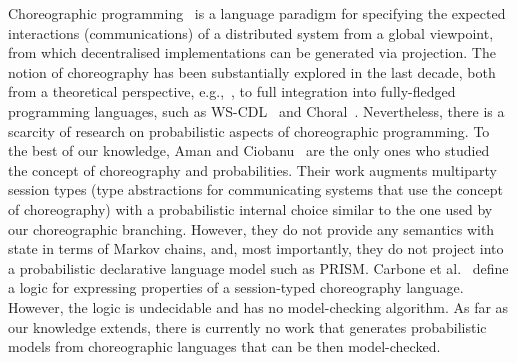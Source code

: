 %
  Choreographic programming~\cite{M23} is a
language paradigm for specifying the expected interactions
(communications) of a distributed system from a global viewpoint,
from which decentralised implementations can be generated via
projection. The notion of choreography has been substantially explored
in the last decade, both from a theoretical perspective,
e.g.,~\cite{CHY12,CM13}, to full integration into fully-fledged
programming languages, such as WS-CDL~\cite{HYC07b} and
Choral~\cite{GMP24}. Nevertheless, there is a scarcity of research on
probabilistic aspects of choreographic programming.
%
To the best of our knowledge, Aman and Ciobanu~\cite{AC19,AC22} are
the only ones who studied the concept of choreography and
probabilities. Their work augments multiparty session types (type
abstractions for communicating systems that use the concept of
choreography) with a probabilistic internal choice similar to the one
used by our choreographic branching. However, they do not provide any
semantics with state in terms of Markov chains, and, most importantly,
they do not project into a probabilistic declarative language model
such as PRISM.
%
Carbone et al.~\cite{CGHL10} define a logic for expressing properties
of a session-typed choreography language. However, the logic is
undecidable and has no model-checking algorithm. %
%
As far as our knowledge extends, there is currently no work that
generates probabilistic models from choreographic languages that can
be then model-checked.



